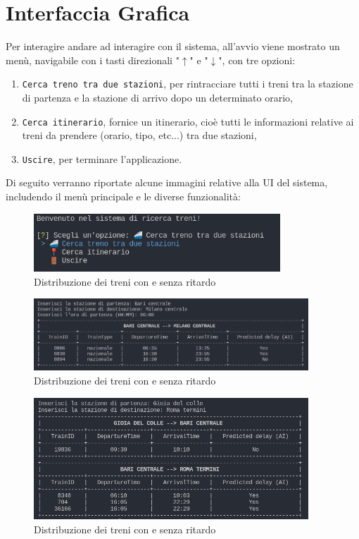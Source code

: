 \documentclass[italian,12pt,a4paper]{article}
\begin{document}
	\section{Interfaccia Grafica}
	Per interagire andare ad interagire con il sistema, all'avvio viene mostrato un menù, navigabile con i tasti direzionali "$\uparrow$" e "$\downarrow$", con tre opzioni:
	
		\begin{enumerate}
			\item \texttt{Cerca treno tra due stazioni}, per rintracciare tutti i treni tra la stazione di partenza e la stazione di arrivo dopo un determinato orario,
			\item \texttt{Cerca itinerario}, fornice un itinerario, cioè tutti le informazioni relative ai treni da prendere (orario, tipo, etc...) tra due stazioni,
			\item \texttt{Uscire}, per terminare l'applicazione.
		\end{enumerate} 
		Di seguito verranno riportate alcune immagini relative alla UI del sistema, includendo il menù principale e le diverse funzionalità:
		
		\begin{figure}[!h]
			\centering
			\includegraphics[width=350px]{img/main_menu}
			\caption{Distribuzione dei treni con e senza ritardo}
		\end{figure}

		\begin{figure}[!h]
			\centering
			\includegraphics[width=390px]{img/search_train}
			\caption{Distribuzione dei treni con e senza ritardo}
		\end{figure}

		\begin{figure}[!h]
			\centering
			\includegraphics[width=390px]{img/search_itin}
			\caption{Distribuzione dei treni con e senza ritardo}
		\end{figure}
		
\end{document}
